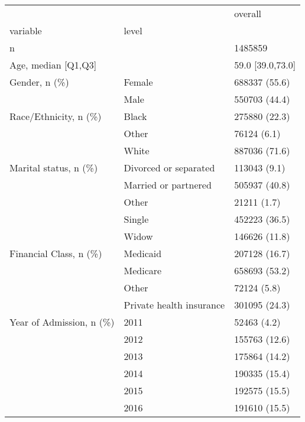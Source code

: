 \begin{tabular}{lll}
\toprule
                                       &   &            overall \\
variable & level &                    \\
\midrule
n &   &            1485859 \\
Age, median [Q1,Q3] &   &   59.0 [39.0,73.0] \\
Gender, n (\%) & Female &      688337 (55.6) \\
                                       & Male &      550703 (44.4) \\
Race/Ethnicity, n (\%) & Black &      275880 (22.3) \\
                                       & Other &        76124 (6.1) \\
                                       & White &      887036 (71.6) \\
Marital status, n (\%) & Divorced or separated &       113043 (9.1) \\
                                       & Married or partnered &      505937 (40.8) \\
                                       & Other &        21211 (1.7) \\
                                       & Single &      452223 (36.5) \\
                                       & Widow &      146626 (11.8) \\
Financial Class, n (\%) & Medicaid &      207128 (16.7) \\
                                       & Medicare &      658693 (53.2) \\
                                       & Other &        72124 (5.8) \\
                                       & Private health insurance &      301095 (24.3) \\
Year of Admission, n (\%) & 2011 &        52463 (4.2) \\
                                       & 2012 &      155763 (12.6) \\
                                       & 2013 &      175864 (14.2) \\
                                       & 2014 &      190335 (15.4) \\
                                       & 2015 &      192575 (15.5) \\
                                       & 2016 &      191610 (15.5) \\

\end{tabular}
